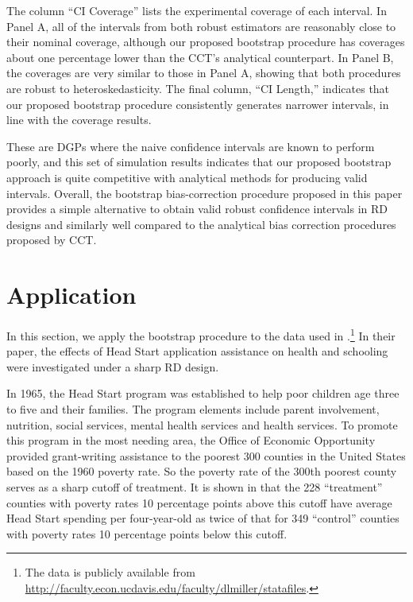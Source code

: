 \documentclass[12pt,fleqn]{article}
\begin{document}
The column ``CI Coverage'' lists the experimental coverage of each interval.
In Panel A, all of the intervals from both robust estimators are reasonably close to their nominal coverage, although
our proposed bootstrap procedure has coverages about one percentage lower than the CCT's analytical counterpart. In Panel B, the coverages are very similar to those in Panel A, showing that both procedures are robust to heteroskedasticity. 
The final column, ``CI Length,'' indicates that our proposed bootstrap procedure consistently generates narrower intervals, in line with the coverage results.

These are DGPs where the naive confidence intervals are known to perform poorly,
and this set of simulation results indicates that our proposed bootstrap approach
is quite competitive with analytical methods for producing valid intervals.
Overall, the bootstrap bias-correction procedure proposed in this paper provides
a simple alternative to obtain valid robust confidence intervals in RD designs
and similarly well compared to the analytical bias correction procedures proposed
by CCT.

\section{Application}\label{application}

In this section, we apply the bootstrap procedure to the data used in
\cite{ludwig2007}.\footnote{%
  The data is publicly available from
  \url{http://faculty.econ.ucdavis.edu/faculty/dlmiller/statafiles}.} %
In their paper, the effects of Head Start application assistance on health and
schooling were investigated under a sharp RD design.

In 1965, the Head Start program was established to help poor children age three
to five and their families. The program elements include parent involvement,
nutrition, social services, mental health services and health services. To
promote this program in the most needing area, the Office of Economic
Opportunity provided grant-writing assistance to the poorest 300 counties in the
United States based on the 1960 poverty rate. So the poverty rate of the 300th
poorest county serves as a sharp cutoff of treatment. It is shown in
\cite{ludwig2007} that the 228 ``treatment'' counties with poverty rates 10
percentage points above this cutoff have average Head Start spending per
four-year-old as twice of that for 349 ``control'' counties with poverty rates
10 percentage points below this cutoff.
\end{document}
